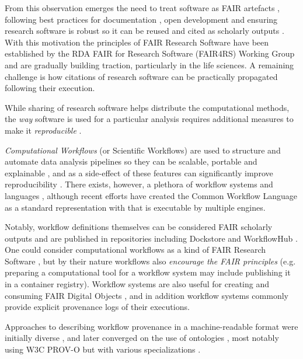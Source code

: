 From this observation emerges the need to treat software as FAIR artefacts \cite{Lamprecht 2019}, following best practices for documentation \cite{Lee 2018}, open development \cite{Prlić 2012} and ensuring research software is robust \cite{Taschuk 2017} so it can be reused and cited as scholarly outputs \cite{Smith 2016}. 
With this motivation the principles of FAIR Research Software \cite{Katz 2021b} have been established by the RDA FAIR for Research Software (FAIR4RS) Working Group \cite{Barker 2022} and are gradually building traction, particularly in the life sciences. A remaining challenge is how citations of research software can be practically propagated following their execution. 

While sharing of research software helps distribute the computational methods, the \emph{way} software is used for a particular analysis requires additional measures to make it \emph{reproducible} \cite{Stodden 2016,Sandve 2013}.

\emph{Computational Workflows} (or Scientific Workflows) are used to structure and automate data analysis pipelines so they can be scalable, portable and explainable \cite{Atkinson 2017}, and as a side-effect of these features can significantly improve reproducibility \cite{Cohen-Boulakia 2017}. 
There exists, however, a plethora of workflow systems and languages \cite{Leipzig 2021,Amstutz 2021}, although recent efforts have created the Common Workflow Language \cite{Crusoe 2022} as a standard representation with  that is executable by multiple engines. 

Notably, workflow definitions themselves can be considered FAIR scholarly outputs \cite{Goble 2020} and are published in repositories including Dockstore \cite{Yuen 2021} and WorkflowHub \cite{Goble 2021}.
One could consider computational workflows as a kind of FAIR Research Software \cite{de Visser 2023}, but by their nature workflows also \emph{encourage the FAIR principles} (e.g. preparing a computational tool for a workflow system \cite{Brack 2022a} may include publishing it in a container registry). Workflow systems are also useful for creating and consuming FAIR Digital Objects \cite{Wittenburg 2022b}, and in addition workflow systems commonly provide explicit provenance logs of their executions.

Approaches to describing workflow provenance in a machine-readable format were initially diverse \cite{Cruz 2009}, and later converged on the use of ontologies \cite{Missier 2010}, most notably using W3C PROV-O \cite{Lebo 2013a} but with various specializations \cite{Garijo 2011,Garijo 2012,Missier 2013,Belhajjame 2015,Cuevas-Vicenttín 2016}. 

